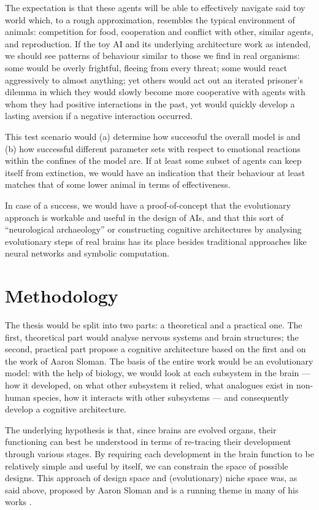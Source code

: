 \documentclass[bibliography=totoc ]{scrartcl}
\begin{document}
The expectation is that these agents will be able to effectively navigate said toy world which, to a rough approximation, resembles the typical environment of animals: competition for food, cooperation and conflict with other, similar agents, and reproduction. If the toy AI and its underlying architecture work as intended, we should see patterns of behaviour similar to those we find in real organisms: some would be overly frightful, fleeing from every threat; some would react aggressively to almost anything; yet others would act out an iterated prisoner's dilemma in which they would slowly become more cooperative with agents with whom they had positive interactions in the past, yet would quickly develop a lasting aversion if a negative interaction occurred.

This test scenario would (a) determine how successful the overall model is and (b) how successful different parameter sets with respect to emotional reactions within the confines of the model are. If at least some subset of agents can keep itself from extinction, we would have an indication that their behaviour at least matches that of some lower animal in terms of effectiveness.

In case of a success, we would have a proof-of-concept that the evolutionary approach is workable and useful in the design of AIs, and that this sort of ``neurological archaeology'' or constructing cognitive architectures by analysing evolutionary steps of real brains has its place besides traditional approaches like neural networks and symbolic computation.

\section{Methodology}

The thesis would be split into two parts: a theoretical and a practical one. The first, theoretical part would analyse nervous systems and brain structures; the second, practical part propose a cognitive architecture based on the first and on the work of Aaron Sloman. The basis of the entire work would be an evolutionary model: with the help of biology, we would look at each subsystem in the brain --- how it developed, on what other subsystem it relied, what analogues exist in non-human species, how it interacts with other subsystems --- and consequently develop a cognitive architecture.

The underlying hypothesis is that, since brains are evolved organs, their functioning can best be understood in terms of re-tracing their development through various stages. By requiring each development in the brain function to be relatively simple and useful by itself, we can constrain the space of possible designs. This approach of design space and (evolutionary) niche space was, as said above, proposed by Aaron Sloman \cite{slomanNiche} and is a running theme in many of his works \cite{sloman2000, sloman1993, sloman1997}.
\end{document}
